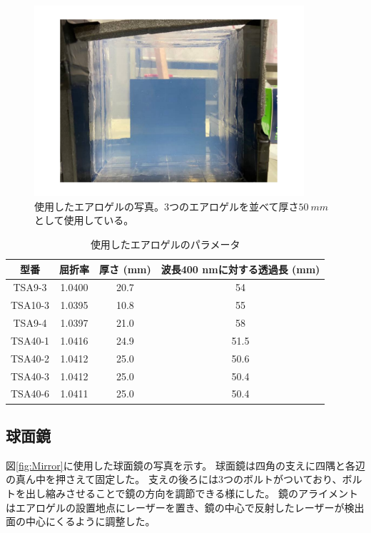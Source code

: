 \begin{figure}
  \centering
  \includegraphics[width=10cm]{images/chapter3/Aerogel.pdf}
  \caption{使用したエアロゲルの写真。3つのエアロゲルを並べて厚さ$\SI{50}{mm}$として使用している。}
  \label{fig:Aerogle}
\end{figure}



\begin{table}[htbp]
  \caption{使用したエアロゲルのパラメータ}
  \label{table:Aerogel}
  \centering
  \begin{tabular}{cccc}
    \hline
    型番      & 屈折率    & 厚さ (mm) & 波長400 nmに対する透過長 (mm) \\
    \hline\hline
    TSA9-3  & 1.0400 & 20.7    & 54                   \\
    TSA10-3 & 1.0395 & 10.8    & 55                   \\
    TSA9-4  & 1.0397 & 21.0    & 58                   \\
    TSA40-1 & 1.0416 & 24.9    & 51.5                 \\
    TSA40-2 & 1.0412 & 25.0    & 50.6                 \\
    TSA40-3 & 1.0412 & 25.0    & 50.4                 \\
    TSA40-6 & 1.0411 & 25.0    & 50.4                 \\
    \hline
  \end{tabular}
\end{table}

\subsection{球面鏡}
図\ref{fig:Mirror}に使用した球面鏡の写真を示す。
球面鏡は四角の支えに四隅と各辺の真ん中を押さえて固定した。
支えの後ろには3つのボルトがついており、ボルトを出し縮みさせることで鏡の方向を調節できる様にした。
鏡のアライメントはエアロゲルの設置地点にレーザーを置き、鏡の中心で反射したレーザーが検出面の中心にくるように調整した。


